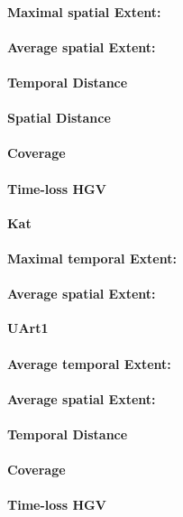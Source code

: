 \paragraph{Maximal spatial Extent:}
\paragraph{Average spatial Extent:}
\paragraph{Temporal Distance}
\paragraph{Spatial Distance}
\paragraph{Coverage}
\paragraph{Time-loss HGV}

\large
\centerline{\textbf{Kat}}
\normalsize

\paragraph{Maximal temporal Extent:}
\paragraph{Average spatial Extent:}

\large
\centerline{\textbf{UArt1}}
\normalsize

\paragraph{Average temporal Extent:}
\paragraph{Average spatial Extent:}
\paragraph{Temporal Distance}
\paragraph{Coverage}
\paragraph{Time-loss HGV}

